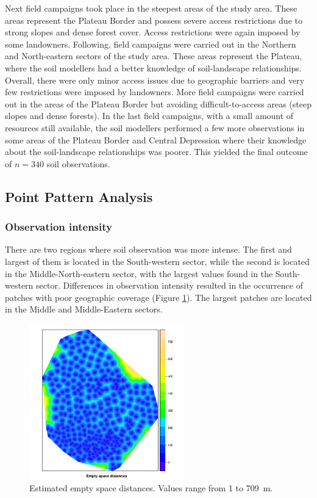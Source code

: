 Next field campaigns took place in the steepest areas of the study area. These areas represent the Plateau 
Border and possess severe access restrictions due to strong slopes and dense forest cover. Access restrictions 
were again imposed by some landowners. Following, field campaigns were carried out in the Northern and 
North-eastern sectors of the study area. These areas represent the Plateau, where the soil modellers had a 
better knowledge of soil-landscape relationships. Overall, there were only minor access issues due to 
geographic barriers and very few restrictions were imposed by landowners. More field campaigns were carried 
out in the areas of the Plateau Border but avoiding difficult-to-access areas (steep slopes and dense forests).
In the last field campaigns, with a small amount of resources still available, the soil modellers performed a 
few more observations in some areas of the Plateau Border and Central Depression where their knowledge about 
the soil-landscape relationships was poorer. This yielded the final outcome of $n = 340$ soil observations.

\subsection{Point Pattern Analysis}

\subsubsection{Observation intensity}

There are two regions where soil observation was more intense. The first and largest of them is located in the 
South-western sector, while the second is located in the Middle-North-eastern sector, with the largest values 
found in the South-western sector. Differences in observation intensity resulted in the occurrence of patches 
with poor geographic coverage (Figure \ref{fig:chap07-intensity}). The largest patches are located in the 
Middle and Middle-Eastern sectors.

\begin{figure}[!ht]
\centering
\includegraphics[width=0.6\textwidth]{fig/chap07-empty-space}
\caption[Estimated empty space distances.]{Estimated empty space distances. Values range from \num{1} to 
\SI{709}{\m}.}
\label{fig:chap07-intensity}
\end{figure}

